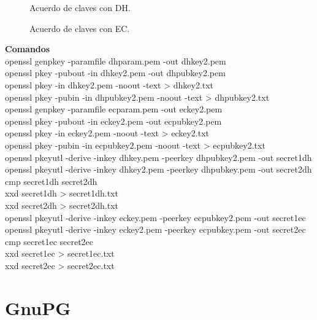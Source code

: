 \documentclass[11pt]{article}
\begin{document}
    \begin{figure}[!ht]
        \centering
        \caption{Acuerdo de claves con DH.}
      \end{figure}
      
      \begin{figure}[!ht]
        \centering
        \caption{Acuerdo de claves con EC.}
      \end{figure}
    \par
    \textbf{Comandos}\\
    openssl genpkey -paramfile dhparam.pem -out dhkey2.pem\\
    openssl pkey -pubout -in dhkey2.pem -out dhpubkey2.pem\\
    openssl pkey -in dhkey2.pem -noout -text > dhkey2.txt\\
    openssl pkey -pubin -in dhpubkey2.pem -noout -text > dhpubkey2.txt\\
    \vspace{2mm}
    openssl genpkey -paramfile ecparam.pem -out eckey2.pem\\
    openssl pkey -pubout -in eckey2.pem -out ecpubkey2.pem\\
    openssl pkey -in eckey2.pem -noout -text > eckey2.txt\\
    openssl pkey -pubin -in ecpubkey2.pem -noout -text > ecpubkey2.txt\\
    \vspace{2mm}
    openssl pkeyutl -derive -inkey dhkey.pem -peerkey dhpubkey2.pem -out secret1dh\\
    openssl pkeyutl -derive -inkey dhkey2.pem -peerkey dhpubkey.pem -out secret2dh\\
    cmp secret1dh secret2dh\\
    xxd secret1dh > secret1dh.txt\\
    xxd secret2dh > secret2dh.txt\\
    \vspace{2mm}
    openssl pkeyutl -derive -inkey eckey.pem -peerkey ecpubkey2.pem -out secret1ec\\
    openssl pkeyutl -derive -inkey eckey2.pem -peerkey ecpubkey.pem -out secret2ec\\
    cmp secret1ec secret2ec\\
    xxd secret1ec > secret1ec.txt\\
    xxd secret2ec > secret2ec.txt

  \section{GnuPG}
\end{document}
